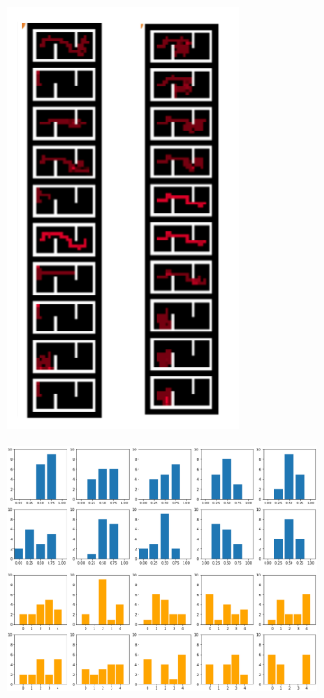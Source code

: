 \begin{figure}[t!]

\hspace{0.2cm}
\begin{subfigure}{0.4\textwidth}
% 
\includegraphics[width=0.75\textwidth]{images/maze.png}
\end{subfigure}
\begin{subfigure}{0.6\textwidth}
    \includegraphics[width=1.\textwidth]{images/hist_k5_halfcheetah.png}


\end{subfigure}
\end{figure}
